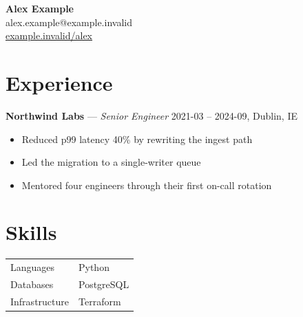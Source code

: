 \documentclass[11pt]{article}
\newcommand{\cventry}[3]{%
  \noindent\textbf{#1} --- \textit{#2} \hfill #3\par\vspace{2pt}%
}
\begin{document}
\begin{center}
  {\LARGE\bfseries Alex Example}\\[2pt]
  alex.example@example.invalid\\
  \href{https://example.invalid/alex}{example.invalid/alex}
\end{center}

\section{Experience}

\cventry{Northwind Labs}{Senior Engineer}{2021-03 -- 2024-09, Dublin, IE}

\begin{itemize}[leftmargin=1.2em,itemsep=1pt]
  \item Reduced p99 latency 40\% by rewriting the ingest path
  \item Led the migration to a single-writer queue
  \item Mentored four engineers through their first on-call rotation
\end{itemize}

\section{Skills}

\begin{tabularx}{\textwidth}{@{}lX@{}}
  Languages & Python \\
  Databases & PostgreSQL \\
  Infrastructure & Terraform \\
\end{tabularx}
\end{document}
